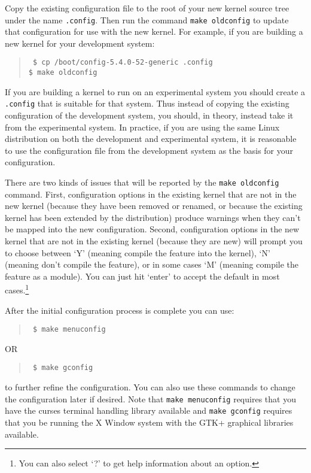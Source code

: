 \documentclass{article}
\newcommand{\command}[1]{\texttt{#1}}
\newcommand{\filename}[1]{\texttt{#1}}
\newenvironment{commands}
  {\begin{quote} \tt}
  {\end{quote}}
\begin{document}
Copy the existing configuration file to the root of your new kernel source tree under the name
\filename{.config}. Then run the command \command{make oldconfig} to update that configuration
for use with the new kernel. For example, if you are building a new kernel for your development
system:
\begin{commands}
\$ cp /boot/config-5.4.0-52-generic .config \\
\$ make oldconfig
\end{commands}

If you are building a kernel to run on an experimental system you should create a
\filename{.config} that is suitable for that system. Thus instead of copying the existing
configuration of the development system, you should, in theory, instead take it from the
experimental system. In practice, if you are using the same Linux distribution on both the
development and experimental system, it is reasonable to use the configuration file from the
development system as the basis for your configuration.

There are two kinds of issues that will be reported by the \command{make oldconfig} command.
First, configuration options in the existing kernel that are not in the new kernel (because they
have been removed or renamed, or because the existing kernel has been extended by the
distribution) produce warnings when they can't be mapped into the new configuration. Second,
configuration options in the new kernel that are not in the existing kernel (because they are
new) will prompt you to choose between `Y' (meaning compile the feature into the kernel), `N'
(meaning don't compile the feature), or in some cases `M' (meaning compile the feature as a
module). You can just hit `enter' to accept the default in most cases.\footnote{You can also
  select `?' to get help information about an option.}

After the initial configuration process is complete you can use:
\begin{commands}
\$ make menuconfig
\end{commands}
OR
\begin{commands}
\$ make gconfig
\end{commands}

to further refine the configuration. You can also use these commands to change the configuration
later if desired. Note that \command{make menuconfig} requires that you have the curses terminal
handling library available and \command{make gconfig} requires that you be running the X Window
system with the GTK+ graphical libraries available.
\end{document}
